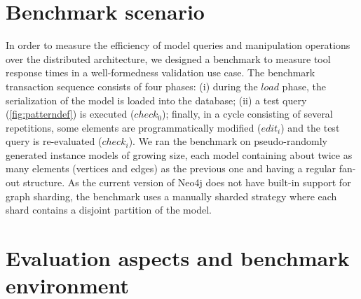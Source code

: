


\section{Benchmark scenario}

\label{benchmark}
In order to measure the efficiency of model queries and manipulation operations over the distributed architecture, we designed a benchmark to measure tool response times in a well-formedness validation use case. The benchmark transaction sequence consists of four phases: (i) during the $load$ phase, the serialization of the model is loaded into the database; (ii) a test query (\autoref{fig:patterndef}) is executed ($check_0$); finally, in a cycle consisting of several repetitions, some elements are programmatically modified ($edit_i$) and the test query is re-evaluated ($check_i$). We ran the benchmark on pseudo-randomly generated instance models of growing size, each model containing about twice as many elements (vertices and edges) as the previous one and having a regular fan-out structure. As the current version of Neo4j does not have built-in support for graph sharding, the benchmark uses a manually sharded strategy where each shard contains a disjoint partition of the model.






\label{benchmark_environment}
\section{Evaluation aspects and benchmark environment}

